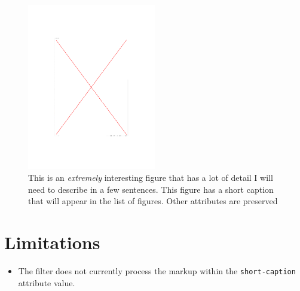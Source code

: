 \hypertarget{fig:shortcap}{%
\begin{figure}
\centering
\includegraphics[width=0.5\textwidth,height=\textheight]{images/fig.pdf}
\caption[An interesting figure]{This is an \emph{extremely} interesting
figure that has a lot of detail I will need to describe in a few
sentences. This figure has a short caption that will appear in the list
of figures. Other attributes are preserved}
\label{fig:shortcap}
\end{figure}
}

\hypertarget{limitations}{%
\section{Limitations}\label{limitations}}

\begin{itemize}
\tightlist
\item
  The filter does not currently process the markup within the
  \texttt{short-caption} attribute value.
\end{itemize}
